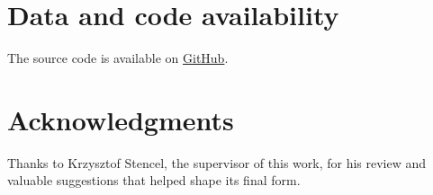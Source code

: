 \documentclass[]{einformatica}
\begin{document}
\maketitle 








\section*{Data and code availability}
The source code is available on \href{https://github.com/Sobczakus1658/Who-adopts-Coding-Agents-on-GitHub}{GitHub}.

\section*{Acknowledgments}
Thanks to Krzysztof Stencel, the supervisor of this work, for his review and valuable suggestions that helped shape its final form.

 

\end{document}
